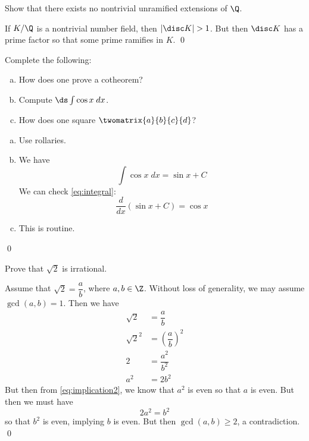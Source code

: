 \documentclass[11pt,letterpaper]{article}
\begin{document}



\problem Show that there exists no nontrivial unramified extensions of $\Q$. \pspace

\solution  If $K/\Q$ is a nontrivial number field, then $|\disc K|>1$. But then $\disc K$ has a prime factor so that some prime ramifies in $K$. \qed \pspace



\problem Complete the following:
        \begin{enumerate}[(a)]
	\item How does one prove a cotheorem?
	\item Compute $\ds \int \cos x \;dx$.
	\item How does one square $\twomatrix{a}{b}{c}{d}$?       
        \end{enumerate}

\solution
\begin{enumerate}[(a)]
\item Use rollaries.

\item We have
	\begin{equation} \label{eq:integral}
	\int \cos x \;dx= \sin x + C	
	\end{equation}
We can check \eqref{eq:integral}:
	\[
	\dfrac{d}{dx} \left( \sin x + C \right)= \cos x
	\]

\item This is routine. 
\end{enumerate} \qed \pspace



\problem Prove that $\sqrt{2}$ is irrational. \pspace

\pf Assume that $\sqrt{2}= \dfrac{a}{b}$, where $a,b \in \Z$. Without loss of generality, we may assume $\gcd(a,b)= 1$. Then we have
	\begin{align}
	\sqrt{2}&= \dfrac{a}{b} \nonumber \\
	\sqrt{2}^2&= \left( \dfrac{a}{b} \right)^2 \label{eq:implication1} \\
	2&= \dfrac{a^2}{b^2} \nonumber \\
	a^2&= 2b^2 \label{eq:implication2}
	\end{align}
But then from \eqref{eq:implication2}, we know that $a^2$ is even so that $a$ is even. But then we must have
	\[
	2a^2= b^2
	\]
so that $b^2$ is even, implying $b$ is even. But then $\gcd(a,b) \geq 2$, a contradiction. \qed \\
\end{document}

